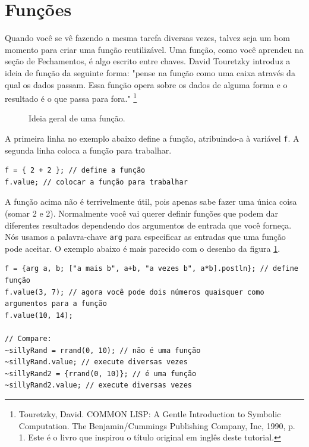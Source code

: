\section{Funções}
\label{sec:functions}

Quando você se vê fazendo a mesma tarefa diversas vezes, talvez seja um bom momento para criar uma função reutilizável. Uma função, como você aprendeu na seção de Fechamentos, é algo escrito entre chaves. David Touretzky introduz a ideia de função da seguinte forma: "pense na função como uma caixa através da qual os dados passam. Essa função opera sobre os dados de alguma forma e o resultado é o que passa para fora." \footnote{Touretzky, David. COMMON LISP: A Gentle Introduction to Symbolic Computation. The Benjamin/Cummings Publishing Company, Inc, 1990, p. 1. Este é o livro que inspirou o título original em inglês deste tutorial.}

\begin{figure}[h]
\centerline{}
\caption{Ideia geral de uma função.}
\label{fig:function-box}
\end{figure}

A primeira linha no exemplo abaixo define a função, atribuindo-a à variável \texttt{f}. A segunda linha coloca a função para trabalhar.

 
\begin{lstlisting}[style=SuperCollider-IDE, basicstyle=\scttfamily\footnotesize]
f = { 2 + 2 }; // define a função
f.value; // colocar a função para trabalhar
\end{lstlisting}
 
A função acima não é terrivelmente útil, pois apenas sabe fazer uma única coisa (somar 2 e 2). Normalmente você vai querer definir funções que podem dar diferentes resultados dependendo dos argumentos de entrada que você forneça. Nós usamos a palavra-chave \texttt{arg} para especificar as entradas que uma função pode aceitar. O exemplo abaixo é mais parecido com o desenho da figura \ref{fig:function-box}.
 
\begin{lstlisting}[style=SuperCollider-IDE, basicstyle=\scttfamily\footnotesize]
f = {arg a, b; ["a mais b", a+b, "a vezes b", a*b].postln}; // define função
f.value(3, 7); // agora você pode dois números quaisquer como argumentos para a função
f.value(10, 14);

// Compare:
~sillyRand = rrand(0, 10); // não é uma função
~sillyRand.value; // execute diversas vezes
~sillyRand2 = {rrand(0, 10)}; // é uma função
~sillyRand2.value; // execute diversas vezes
\end{lstlisting}
 
